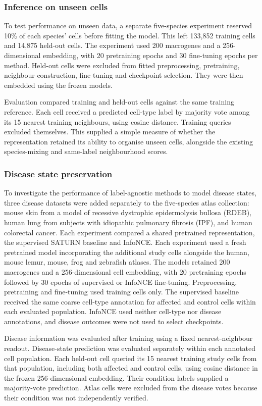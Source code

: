 \documentclass{article}
\begin{document}
\subsubsection{Inference on unseen cells}
To test performance on unseen data, a separate five-species experiment reserved 10\% of each species' cells before fitting the model. This left 133,852 training cells and 14,875 held-out cells. The experiment used 200 macrogenes and a 256-dimensional embedding, with 20 pretraining epochs and 30 fine-tuning epochs per method. Held-out cells were excluded from fitted preprocessing, pretraining, neighbour construction, fine-tuning and checkpoint selection. They were then embedded using the frozen models.

Evaluation compared training and held-out cells against the same training reference. Each cell received a predicted cell-type label by majority vote among its 15 nearest training neighbours, using cosine distance. Training queries excluded themselves. This supplied a simple measure of whether the representation retained its ability to organise unseen cells, alongside the existing species-mixing and same-label neighbourhood scores.
\subsubsection{Disease state preservation}
To investigate the performance of label-agnostic methods to model disease states, three disease datasets were added separately to the five-species atlas collection: mouse skin from a model of recessive dystrophic epidermolysis bullosa (RDEB), human lung from subjects with idiopathic pulmonary fibrosis (IPF), and human colorectal cancer. Each experiment compared a shared pretrained representation, the supervised SATURN baseline and InfoNCE. Each experiment used a fresh pretrained model incorporating the additional study cells alongside the human, mouse lemur, mouse, frog and zebrafish atlases. The models retained 200 macrogenes and a 256-dimensional cell embedding, with 20 pretraining epochs followed by 30 epochs of supervised or InfoNCE fine-tuning.  Preprocessing, pretraining and fine-tuning used training cells only. The supervised baseline received the same coarse cell-type annotation for affected and control cells within each evaluated population. InfoNCE used neither cell-type nor disease annotations, and disease outcomes were not used to select checkpoints.

Disease information was evaluated after training using a fixed nearest-neighbour readout. Disease-state prediction was evaluated separately within each annotated cell population. Each held-out cell queried its 15 nearest training study cells from that population, including both affected and control cells, using cosine distance in the frozen 256-dimensional embedding. Their condition labels supplied a majority-vote prediction. Atlas cells were excluded from the disease votes because their condition was not independently verified. 
\end{document}
